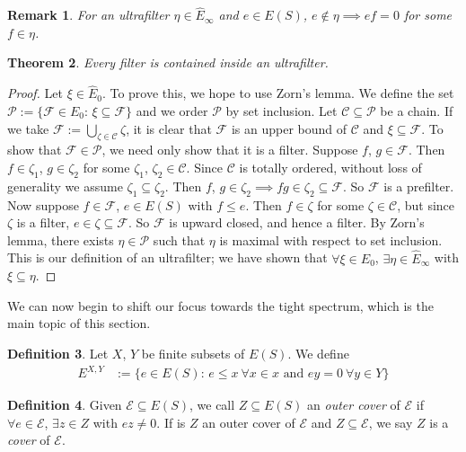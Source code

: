 \documentclass{article}
\newtheorem{theorem}{Theorem}[section]
\newtheorem{remark}[theorem]{Remark}
\theoremstyle{definition}
\newtheorem{definition}[theorem]{Definition}
\begin{document}
\begin{remark} For an ultrafilter $\eta \in \hat{E}_\infty$ and $e \in E(S)$, $e \notin \eta \implies ef = 0$ for some $f \in \eta$. \end{remark}

\begin{theorem} Every filter is contained inside an ultrafilter. \end{theorem}
\begin{proof}
    Let $\xi \in \hat{E}_0$. To prove this, we hope to use Zorn's lemma. We define the set 
    $\mathcal{P} := \{\mathcal{F} \in \hat{E_0} \text{: } \xi \subseteq \mathcal{F}\}$ and 
    we order $\mathcal{P}$ by set inclusion. Let $\mathcal{C} \subseteq \mathcal{P}$ be a chain. 
    If we take $\mathcal{F} := \bigcup_{\zeta \in \mathcal{C}} \zeta$, it is clear that $\mathcal{F}$ is 
    an upper bound of $\mathcal{C}$ and $\xi \subseteq \mathcal{F}$. To show that $\mathcal{F} \in \mathcal{P}$, we
    need only show that it is a filter. Suppose $f$, $g \in \mathcal{F}$. Then $f \in \zeta_1$, $g \in \zeta_2$ for
    some $\zeta_1$, $\zeta_2 \in \mathcal{C}$. Since $\mathcal{C}$ is totally ordered, without loss of generality we
    assume $\zeta_1 \subseteq \zeta_2$. Then $f$, $g \in \zeta_2 \implies fg \in \zeta_2 \subseteq \mathcal{F}$.
    So $\mathcal{F}$ is a prefilter. Now suppose $f \in \mathcal{F}$, $e \in E(S)$ with $f \leq e$. Then $f \in \zeta$ for
    some $\zeta \in \mathcal{C}$, but since $\zeta$ is a filter, $e \in \zeta \subseteq \mathcal{F}$. So $\mathcal{F}$ is
    upward closed, and hence a filter. By Zorn's lemma, there exists $\eta \in \mathcal{P}$ such that $\eta$ is maximal
    with respect to set inclusion. This is our definition of an ultrafilter; we have shown that $\forall \xi \in \hat{E}_0$, $\exists \eta \in \hat{E}_\infty$ with
    $\xi \subseteq \eta$.
\end{proof}

We can now begin to shift our focus towards the tight spectrum, which is the main topic of this section.

\begin{definition} Let $X$, $Y$ be finite subsets of $E(S)$. We define
    \begin{align*} 
        E^{X, Y} &:= \{ e \in E(S) \text{: } e \leq x \ \forall x \in x \text{ and } ey = 0 \ \forall y \in Y \}
    \end{align*}
\end{definition}

\begin{definition}
    Given $\mathcal{E} \subseteq E(S)$, we call $Z \subseteq E(S)$ an \textit{outer cover} of $\mathcal{E}$ if
    $\forall e \in \mathcal{E}$, $\exists z \in Z$ with $ez \neq 0$. If is $Z$ an outer cover of $\mathcal{E}$ 
    and $Z \subseteq \mathcal{E}$, we say $Z$ is a \textit{cover} of $\mathcal{E}$.
\end{definition}
\end{document}
